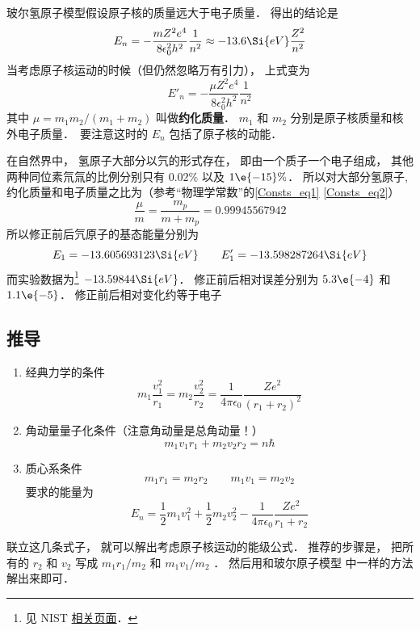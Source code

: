 
玻尔氢原子模型假设原子核的质量远大于电子质量． 得出的结论是
\begin{equation}
E_n = -\frac{mZ^2 e^4}{8\epsilon_0^2 h^2}\frac{1}{n^2} \approx  - 13.6\Si{eV} \frac{Z^2}{n^2}
\end{equation}
当考虑原子核运动的时候（但仍然忽略万有引力）， 上式变为
\begin{equation}\label{HRMass_eq1}
E'_n = -\frac{\mu Z^2 e^4}{8\epsilon_0^2 h^2} \frac{1}{n^2}
\end{equation}
其中 $\mu  = m_1 m_2/(m_1 + m_2)$ 叫做\textbf{约化质量}． $m_1$ 和 $m_2$ 分别是原子核质量和核外电子质量．　要注意这时的 $E_n$ 包括了原子核的动能．

在自然界中， 氢原子大部分以氕的形式存在， 即由一个质子一个电子组成， 其他两种同位素氘氚的比例分别只有 $0.02\%$ 以及 $1\e{-15}\%$． 所以对大部分氢原子, 约化质量和电子质量之比为（参考“物理学常数”的\autoref{Consts_eq1} \autoref{Consts_eq2}）
\begin{equation}
\frac{\mu}{m} = \frac{m_p}{m + m_p} = 0.99945567942
\end{equation}
所以修正前后氕原子的基态能量分别为
\begin{equation}
E_1 = -13.605693123\Si{eV} \qquad 
E'_1 = -13.598287264\Si{eV}
\end{equation}
而实验数据为\footnote{见 NIST \href{https://webbook.nist.gov/cgi/cbook.cgi?ID=C12385136&Mask=20}{相关页面}．} $-13.59844\Si{eV}$． 修正前后相对误差分别为 $5.3\e{-4}$ 和 $1.1\e{-5}$． 修正前后相对变化约等于电子

\subsection{推导}
\begin{enumerate}
\item 经典力学的条件
\begin{equation}
m_1 \frac{v_1^2}{r_1} = m_2 \frac{v_2^2}{r_2} = \frac{1}{4\pi\epsilon_0} \frac{Z e^2}{(r_1 + r_2)^2}
\end{equation}
\item 角动量量子化条件（注意角动量是总角动量！）
\begin{equation}
m_1 v_1 r_1 + m_2 v_2 r_2 = n\hbar 
\end{equation}
\item 质心系条件
\begin{equation}
m_1 r_1 = m_2 r_2 \qquad m_1 v_1 = m_2 v_2
\end{equation}
要求的能量为
\begin{equation}
E_n = \frac12 m_1 v_1^2 + \frac12 m_2 v_2^2 - \frac{1}{4\pi\epsilon_0} \frac{Z e^2}{r_1 + r_2}
\end{equation}
\end{enumerate}
联立这几条式子， 就可以解出考虑原子核运动的能级公式． 推荐的步骤是， 把所有的 $r_2$ 和 $v_2$ 写成 $m_1 r_1/m_2$ 和 $m_1 v_1/m_2$ ． 然后用和玻尔原子模型%
中一样的方法解出来即可．
